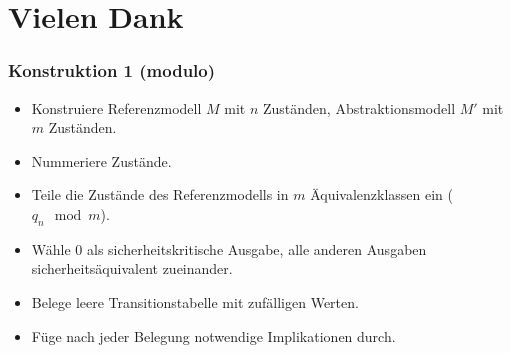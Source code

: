 \section*{Vielen Dank}
\backupbegin

\begin{frame}
  \frametitle{Konstruktion 1 (modulo)}
  \begin{itemize}
    \item Konstruiere Referenzmodell $M$ mit $n$ Zuständen, Abstraktionsmodell $M'$ mit $m$ Zuständen.
    \item Nummeriere Zustände.
    \item Teile die Zustände des Referenzmodells in $m$ Äquivalenzklassen ein ($q_n \mod m$).
    \item Wähle $0$ als sicherheitskritische Ausgabe, alle anderen Ausgaben sicherheitsäquivalent zueinander.
    \item Belege leere Transitionstabelle mit zufälligen Werten.
    \item Füge nach jeder Belegung notwendige Implikationen durch.
  \end{itemize}
\end{frame}


